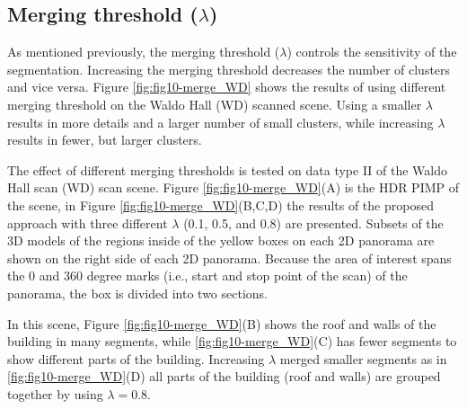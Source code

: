 \documentclass[final,3p,times,twocolumn,authoryear]{elsarticle}
\begin{document}
\subsection{Merging threshold ($\lambda$)}
As mentioned previously, the merging threshold ($\lambda$) controls the sensitivity of the segmentation. Increasing the merging threshold decreases the number of clusters and vice versa. Figure \ref{fig:fig10-merge_WD} shows the results of using different merging threshold on the Waldo Hall (WD) scanned scene. Using a smaller $\lambda$ results in more details and a larger number of small clusters, while increasing $\lambda$ results in fewer, but larger clusters.  

%
%

The effect of different merging thresholds is tested on data type II of the Waldo Hall scan (WD) scan scene. Figure \ref{fig:fig10-merge_WD}(A) is the HDR PIMP of the scene, in Figure \ref{fig:fig10-merge_WD}(B,C,D) the results of the proposed approach with three different $\lambda$ (0.1, 0.5, and 0.8) are presented. Subsets of the 3D models of the regions inside of the yellow boxes on each 2D panorama are shown on the right side of each 2D panorama. Because the area of interest spans the 0 and 360 degree marks (i.e., start and stop point of the scan) of the panorama, the box is divided into two sections.

In this scene, Figure \ref{fig:fig10-merge_WD}(B) shows the roof and walls of the building in many segments, while \ref{fig:fig10-merge_WD}(C) has fewer segments to show different parts of the building. Increasing $\lambda$ merged smaller segments as in \ref{fig:fig10-merge_WD}(D) all parts of the building (roof and walls) are grouped together by using $\lambda=0.8$. 
\end{document}
